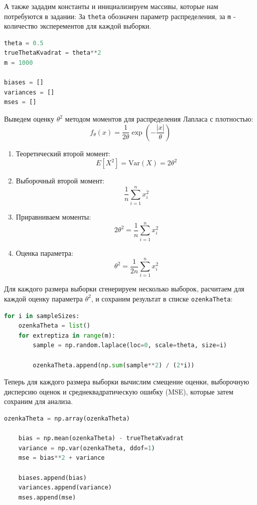 \documentclass[14pt]{extreport}
\begin{document}
А также зададим константы и инициализируем массивы, которые нам потребуются в задании:
За \texttt{theta} обозначен параметр распределения, за \texttt{m} - количество эксперементов для каждой выборки.
\begin{lstlisting}[language=Python, caption={Init}]
theta = 0.5 
trueThetaKvadrat = theta**2
m = 1000 

biases = []
variances = []
mses = []
\end{lstlisting}


Выведем оценку $\theta^2$ методом моментов для распределения Лапласа с плотностью:
\[
f_\theta(x) = \frac{1}{2\theta} \exp\left(-\frac{|x|}{\theta}\right)
\]

\begin{enumerate}
    \item Теоретический второй момент:
    \[
    E[X^2] = \text{Var}(X) = 2\theta^2
    \]
    
    \item Выборочный второй момент:
    \[
    \frac{1}{n}\sum_{i=1}^n x_i^2
    \]
    
    \item Приравниваем моменты:
    \[
    2\theta^2 = \frac{1}{n}\sum_{i=1}^n x_i^2
    \]
    
    \item Оценка параметра:
    \[
    \theta^2 = \frac{1}{2n} \sum_{i=1}^n x_i^2
    \]
\end{enumerate}


Для каждого размера выборки сгенерируем несколько выборок, 
расчитаем для каждой оценку параметра \( \theta^2 \), 
и сохраним результат в списке \texttt{ozenkaTheta}:

\begin{lstlisting}[language=Python, caption={Цикл}]
for i in sampleSizes:
    ozenkaTheta = list()
    for extreptiza in range(m):
        sample = np.random.laplace(loc=0, scale=theta, size=i)

        ozenkaTheta.append(np.sum(sample**2) / (2*i))
\end{lstlisting}

Теперь для каждого размера выборки вычислим смещение оценки, 
 выборочную дисперсию оценок и среднеквадратическую ошибку (MSE), 
 которые затем сохраним для анализа.

 \begin{lstlisting}[language=Python, caption={Расчет}]
    ozenkaTheta = np.array(ozenkaTheta)

    bias = np.mean(ozenkaTheta) - trueThetaKvadrat
    variance = np.var(ozenkaTheta, ddof=1)
    mse = bias**2 + variance

    biases.append(bias)
    variances.append(variance)
    mses.append(mse)
\end{lstlisting}
\end{document}
